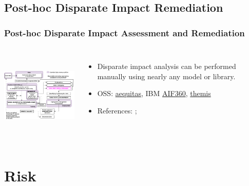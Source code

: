 \documentclass[11pt,
               aspectratio=169,
               hyperref={colorlinks}
               ]{beamer}
\begin{document}
		\subsection{Post-hoc Disparate Impact Remediation}
		
			\begin{frame}		
		
			\frametitle{Post-hoc Disparate Impact Assessment and Remediation}		
			
			\begin{columns}
	
				\centering
				\includegraphics[height=120pt]{img/fair.png}
				
				\vspace{-5pt}
				\begin{itemize}
					\item Disparate impact analysis can be performed manually using nearly any model or library.
					\item OSS: \href{https://github.com/dssg/aequitas}{aequitas}, IBM \href{https://github.com/IBM/AIF360}{AIF360}, \href{https://github.com/LASER-UMASS/Themis}{themis}
					\item References: ;  
				\end{itemize}
				
			\end{columns}
		
		\end{frame}
		
	\section{Risk}
\end{document}
